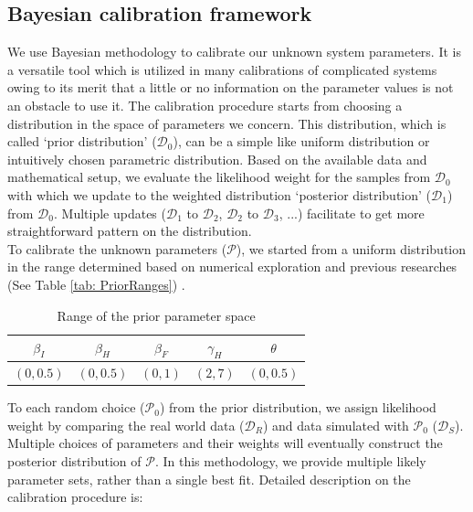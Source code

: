 \subsection{Bayesian calibration framework}

We use Bayesian methodology to calibrate our unknown system parameters. It is a versatile tool which is utilized in many calibrations of complicated systems owing to its merit that a little or no information on the parameter values is not an obstacle to use it. The calibration procedure starts from choosing a distribution in the space of parameters we concern. This distribution, which is called `prior distribution' ($\mathcal{D}_0$), can be a simple like uniform distribution or intuitively chosen parametric distribution. Based on the available data and mathematical setup, we evaluate the likelihood weight for the samples from $\mathcal{D}_0$ with which we update to the weighted distribution `posterior distribution' ($\mathcal{D}_1$) from $\mathcal{D}_0$. Multiple updates ($\mathcal{D}_1$ to $\mathcal{D}_2$, $\mathcal{D}_2$ to $\mathcal{D}_3$, ...) facilitate to get more straightforward pattern on the distribution.\\
To calibrate the unknown parameters ($\mathcal{P}$), we started from a uniform distribution in the range determined based on numerical exploration and previous researches (See Table \ref{tab: PriorRanges}) \cite{Rivers2014}. \\

\begin{table}[ht]
\caption{Range of the prior parameter space} %
\centering %
\begin{tabular}{c c c c c}
\hline\hline %
$\beta_{I}$ & $\beta_{H}$ & $\beta_{F}$ & $\gamma_{H}$ & $\theta$ \\ [0.5ex]
\hline %
$(0,0.5)$ & $(0,0.5)$ & $(0,1)$ & $(2,7)$ & $(0,0.5)$ \\ [0.5ex]
\hline
\end{tabular}
\label{tab:PriorRanges}
\end{table}


To each random choice ($\mathcal{P}_0$) from the prior distribution, we assign likelihood weight by comparing the real world data ($\mathcal{D}_R$) and data simulated with $\mathcal{P}_0$ ($\mathcal{D}_S$). Multiple choices of parameters and their weights will eventually construct the posterior distribution of $\mathcal{P}$. In this methodology, we provide multiple likely parameter sets, rather than a single best fit. Detailed description on the calibration procedure is:\\

